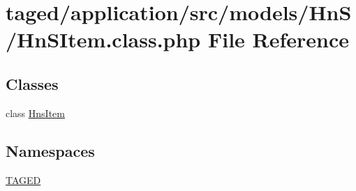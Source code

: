 \hypertarget{_hn_s_item_8class_8php}{}\section{taged/application/src/models/\+Hn\+S/\+Hn\+S\+Item.class.\+php File Reference}
\label{_hn_s_item_8class_8php}
\subsection*{Classes}
\begin{DoxyCompactItemize}
\item 
class \hyperlink{class_hns_item}{Hns\+Item}
\end{DoxyCompactItemize}
\subsection*{Namespaces}
\begin{DoxyCompactItemize}
\item 
 \hyperlink{namespace_t_a_g_e_d}{T\+A\+G\+ED}
\end{DoxyCompactItemize}
